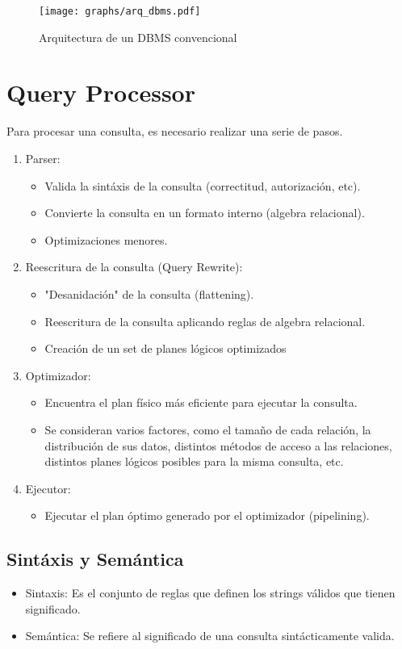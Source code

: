 \begin{figure}[h]
  \centering
  \texttt{[image: graphs/arq\_dbms.pdf]}
  \caption{Arquitectura de un DBMS convencional}
\end{figure}

\section{Query Processor}
Para procesar una consulta, es necesario realizar una serie de pasos.
\begin{enumerate}
  \item Parser:
  \begin{itemize}
    \item Valida la sintáxis de la consulta (correctitud, autorización, etc).
    \item Convierte la consulta en un formato interno (algebra relacional).
    \item Optimizaciones menores.
  \end{itemize}
  \item Reescritura de la consulta (Query Rewrite):
  \begin{itemize}
    \item "Desanidación" de la consulta (flattening).
    \item Reescritura de la consulta aplicando reglas de algebra relacional.
    \item Creación de un set de planes lógicos optimizados
  \end{itemize}
  \item Optimizador:
  \begin{itemize}
    \item Encuentra el plan físico más eficiente para ejecutar la consulta.
    \item Se consideran varios factores, como el tamaño de cada relación, la distribución de sus datos, distintos métodos de acceso a las relaciones, distintos planes lógicos posibles para la misma consulta, etc.
  \end{itemize}
  \item Ejecutor:
  \begin{itemize}
    \item Ejecutar el plan óptimo generado por el optimizador (pipelining).
  \end{itemize}
\end{enumerate}

\subsection{Sintáxis y Semántica}
\begin{itemize}
  \item Sintaxis: Es el conjunto de reglas que definen los strings válidos que tienen significado.
  \item Semántica: Se refiere al significado de una consulta sintácticamente valida.
\end{itemize}

